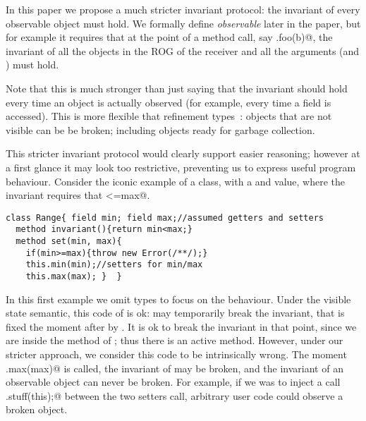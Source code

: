 In this paper we propose a much stricter invariant protocol: the invariant of every observable object must hold. We formally define \emph{observable} later in the paper, but for example it requires that
 at the point of a method call, say \Q@a.foo(b)@,
the invariant of all the objects in the ROG of the receiver and all
the arguments (\Q@a@ and \Q@b@) must hold.

Note that this is much stronger than just saying that the invariant
should hold every time an object is actually observed (for example,
every time a field is accessed).
This is more flexible that refinement types~\cite{?}: 
objects that are not visible can be be broken;
including objects ready for garbage collection.

This stricter invariant protocol would clearly support easier reasoning; however 
at a first glance it may look too restrictive, preventing us to express useful program behaviour.
Consider the iconic example of a \Q@Range@ class, with a \Q@min@ and \Q@max@
value, where the invariant requires that \Q@min<=max@.
\begin{lstlisting}
class Range{ field min; field max;//assumed getters and setters
  method invariant(){return min<max;}
  method set(min, max){
    if(min>=max){throw new Error(/**/);}
    this.min(min);//setters for min/max
    this.max(max); }  }
\end{lstlisting}
In this first example we omit types to focus on the behaviour.
Under the visible state semantic, this code of \Q@set@ is ok:
\Q@min@ may temporarily break the invariant, that is fixed the moment
after by \Q@max@. It is ok to break the invariant in that point, since
we are inside the method \Q@set@ of \Q@Range@; thus there is an active method.
However, under our stricter approach, we consider this code to be intrinsically wrong. The moment
\Q@this.max(max)@ is called, the invariant of \Q@this@ may be broken, and
the invariant of an observable object can never be broken. For example, if we was to inject a call
\Q@Do.stuff(this);@ between the two setters call,
arbitrary user code could observe a broken object.


